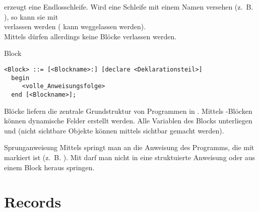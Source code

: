  erzeugt eine Endlosschleife.
Wird eine Schleife mit einem Namen versehen (z.~B.
), so kann sie mit \\
 verlassen werden
( kann weggelassen werden). \\
Mittels  dürfen allerdings keine Blöcke verlassen werden.

\begin{Def}{Block}
\begin{lstlisting}[language=ebnf,
emph={declare,begin,end},
emphstyle=\underbar]
<Block> ::= [<Blockname>:] [declare <Deklarationsteil>]
  begin
     <volle_Anweisungsfolge>
  end [<Blockname>];
\end{lstlisting}
    Blöcke liefern die zentrale Grundstruktur von Programmen in \Ada{}.
    Mittels -Blöcken können dynamische Felder erstellt werden.
    Alle Variablen des Blocks unterliegen  und
    (nicht sichtbare Objekte können mittels
    sichtbar gemacht werden).
\end{Def}

\begin{Def}{Sprunganweisung}
    Mittels  springt man an die Anweisung des Programms,
    die mit  markiert ist (z.~B. ).
    Mit  darf man nicht in eine struktuierte Anweisung oder
    aus einem Block heraus springen.
\end{Def}

\pagebreak

\section{%
    Records%
}

